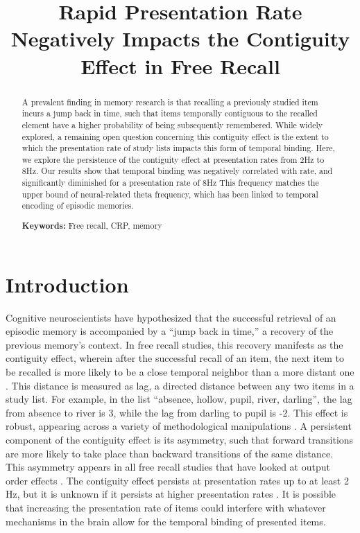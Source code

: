 \documentclass[10pt,letterpaper]{article}
\title{Rapid Presentation Rate Negatively Impacts the Contiguity Effect in Free Recall}
\author{{\large \bf Claudio Toro-Serey (ctoro@bu.edu) \and Ian M. Bright (imbright@bu.edu)} \\
  Department of Psychological and Brain Sciences, 64 Cummington Mall\\
  Boston, MA 02215 USA
  \AND
    {\large \bf Brad Wyble (bpw10@psu.edu)} \\
  Department of Psychology, 140 Moore Building\\
  University Park, PA 16801 USA
  \AND
  {\large \bf Marc W. Howard (marc777@bu.edu)} \\
  Department of Psychological and Brain Sciences, 64 Cummington Mall\\
  Boston, MA 02215 USA}
\begin{document}
\maketitle

\begin{abstract}
A prevalent finding in memory research is that recalling a previously studied item incurs a jump back in time, such that items temporally contiguous to the recalled element have a higher probability of being subsequently remembered. While widely explored, a remaining open question concerning this contiguity effect is the extent to which the presentation rate of study lists impacts this form of temporal binding. Here, we explore the persistence of the contiguity effect at presentation rates from 2Hz to 8Hz. Our results show that temporal binding was negatively correlated with rate, and significantly diminished for a presentation rate of 8Hz This frequency matches the upper bound of neural-related theta frequency, which has been linked to temporal encoding of episodic memories. 

\textbf{Keywords:} 
Free recall, CRP, memory
\end{abstract}

\section{Introduction}

Cognitive neuroscientists have hypothesized that the successful retrieval of an episodic memory is accompanied by a ``jump back in time,'' a recovery of the previous memory's context. \cite{Tulv83}
In free recall studies, this recovery manifests as the contiguity effect, wherein after the successful recall of an item, the next item to be recalled is more likely to be a close temporal neighbor than a more distant one \cite{Kaha96}. 
This distance is measured as lag, a directed distance between any two items in a study list. For example, in the list ``absence, hollow, pupil, river, darling'', the lag from absence to river is 3, while the lag from darling to pupil is -2. 
This effect is robust, appearing across a variety of methodological manipulations \cite{Kaha12}. 
A persistent component of the contiguity effect is its asymmetry, such that forward transitions are more likely to take place than backward transitions of the same distance. 
This asymmetry appears in all free recall studies that have looked at output order effects \cite{KahaEtal08}. 
The contiguity effect persists at presentation rates up to at least 2 Hz, but it is unknown if it persists at higher presentation rates \cite{Kaha96}. 
It is possible that increasing the presentation rate of items could interfere with whatever mechanisms in the brain allow for the temporal binding of presented items. 
\end{document}
